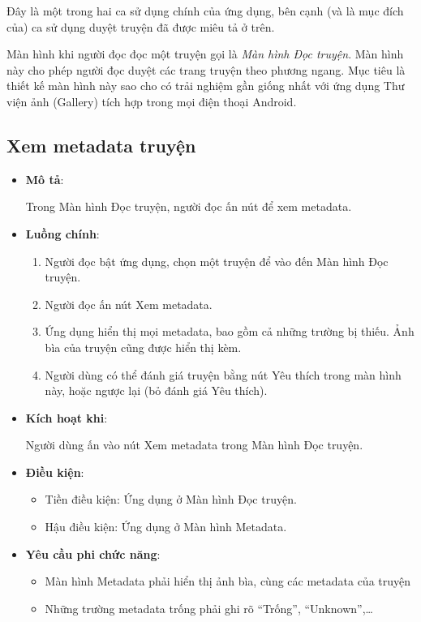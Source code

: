 \documentclass[../../thesis]{subfiles}
\begin{document}
Đây là một trong hai ca sử dụng chính của ứng dụng, bên cạnh (và là mục đích
của) ca sử dụng duyệt truyện đã được miêu tả ở trên.

Màn hình khi người đọc đọc một truyện gọi là \emph{Màn hình Đọc truyện}. Màn
hình này cho phép người đọc duyệt các trang truyện theo phương ngang. Mục tiêu
là thiết kế màn hình này sao cho có trải nghiệm gần giống nhất với ứng dụng Thư
viện ảnh (Gallery) tích hợp trong mọi điện thoại Android.

\subsection{Xem metadata truyện}\label{sec:view-metadata}

\begin{itemize}
    \item
        \textbf{Mô tả}:

        Trong Màn hình Đọc truyện, người đọc ấn nút để xem metadata.
    \item
        \textbf{Luồng chính}:

        \begin{enumerate}
            \item
                Người đọc bật ứng dụng, chọn một truyện để vào đến Màn hình Đọc
                truyện.
            \item
                Người đọc ấn nút Xem metadata.
            \item
                Ứng dụng hiển thị mọi metadata, bao gồm cả những trường bị
                thiếu. Ảnh bìa của truyện cũng được hiển thị kèm.
            \item
                Người dùng có thể đánh giá truyện bằng nút Yêu thích trong màn
                hình này, hoặc ngược lại (bỏ đánh giá Yêu thích).
        \end{enumerate}
    \item
        \textbf{Kích hoạt khi}:

        Người dùng ấn vào nút Xem metadata trong Màn hình Đọc truyện.
    \item
        \textbf{Điều kiện}:

        \begin{itemize}
            \item
                Tiền điều kiện: Ứng dụng ở Màn hình Đọc truyện.
            \item
                Hậu điều kiện: Ứng dụng ở Màn hình Metadata.
        \end{itemize}
    \item
        \textbf{Yêu cầu phi chức năng}:

        \begin{itemize}
            \item
                Màn hình Metadata phải hiển thị ảnh bìa, cùng các metadata của
                truyện
            \item
                Những trường metadata trống phải ghi rõ ``Trống'',
                ``Unknown'',\ldots{}
        \end{itemize}
  \end{itemize}
\end{document}
